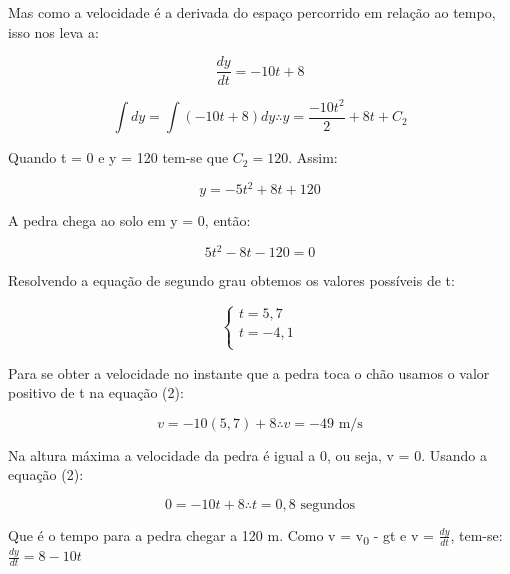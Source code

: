 \documentclass{beamer}
\begin{document}
	\begin{frame}
		Mas como a velocidade é a derivada do espaço percorrido em relação ao tempo, isso nos leva a:
		
		\begin{displaymath}
			\frac{dy}{dt} =-10t + 8
		\end{displaymath}
		
		\begin{displaymath}
			\int dy = \int (-10t +8) dy \therefore y = \frac{-10t^2}{2} + 8t + C_2
		\end{displaymath} \pause
		
		Quando t = 0 e y = 120 tem-se que \(C_2 = 120\). Assim:
		
		\begin{equation}
			\boxed{ y = -5t^2 +8t + 120 }
		\end{equation} \pause
		
		A pedra chega ao solo em y = 0, então:
		
		\begin{displaymath}
			5t^2 - 8t - 120 = 0
		\end{displaymath}
	\end{frame}
	
	\begin{frame}
		Resolvendo a equação de segundo grau obtemos os valores possíveis de t:
		
		$$\left\{ \begin{array}{l}
		t = 5,7\\
		t = -4,1\\
		\end{array}
		\right.$$ \pause
		
		Para se obter a velocidade no instante que a pedra toca o chão usamos o valor positivo de t na equação (2): 
		
		\begin{displaymath}
			v = -10(5,7) + 8 \therefore v = -49 \text{ m/s}
		\end{displaymath} \pause
		
		Na altura máxima a velocidade da pedra é igual a 0, ou seja, v = 0. Usando a equação (2):
		
		\begin{displaymath}
			0 = -10t + 8 \therefore t = 0,8 \text{ segundos}
		\end{displaymath} \pause
		
		Que é o tempo para a pedra chegar a 120 m. Como v = v\textsubscript{0} - gt e v = \(\frac{dy}{dt}\), tem-se: \(\frac{dy}{dt} = 8 - 10t\)
		
		
	\end{frame}
	
\end{document}
